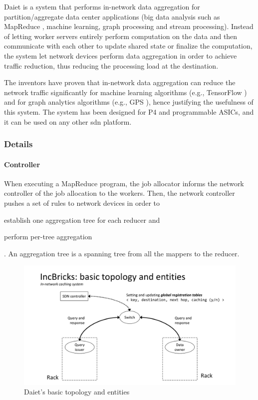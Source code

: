 Daiet \cite{daiet} is a system that performs in-network data aggregation for partition/aggregate data center applications (big data analysis such as MapReduce \cite{mapreduce}, machine learning, graph processing and stream processing).
Instead of letting worker servers entirely perform computation on the data and then communicate with each other to update shared state or finalize the computation, the system let network devices perform data aggregation in order to achieve traffic reduction, thus reducing the processing load at the destination.\par
The inventors have proven that in-network data aggregation can reduce the network traffic significantly for machine learning algorithms (e.g., TensorFlow \cite{tensorflow}) and for graph analytics algorithms (e.g., GPS \cite{gps}), hence justifying the usefulness of this system. The system has been designed for P4 \cite{p4} and programmable ASICs, and it can be used on any other \gls{sdn} platform.

\subsubsection{Details}
\paragraph{Controller}
When executing a MapReduce program, the job allocator informs the network controller of the job allocation to the workers.
Then, the network controller pushes a set of rules to network devices in order to
\begin{mylist}
    \item establish one aggregation tree for each reducer and
    \item perform per-tree aggregation
\end{mylist}.
An aggregation tree is a spanning tree from all the mappers to the reducer.

\begin{figure}[!htb]
    \centering
        \includegraphics[page=9, clip, trim=0.25cm 1.1cm 0.25cm 4.7cm, width=1.00\textwidth]{figures/analysis/inp/presentation.pdf}
    \caption{Daiet's \texorpdfstring{\cite{daiet}}{} basic topology and entities}
\end{figure}

